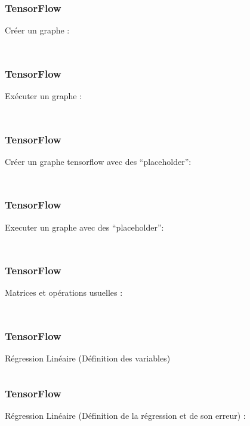 
\begin{frame}
  \frametitle{TensorFlow}
  Créer un graphe :
  \inputminted[linenos,fontsize=\small,bgcolor=pythonbg]{python}{code-illustration/tf-create_graph.py}
  \inputminted[linenos,fontsize=\small,bgcolor=returnbg]{text}{code-illustration/tf-create_graph.txt}
\end{frame}

\begin{frame}
  \frametitle{TensorFlow}
  Exécuter un graphe :
  \inputminted[linenos,fontsize=\small,bgcolor=pythonbg]{python}{code-illustration/tf-run_graph.py}
  \inputminted[linenos,fontsize=\small,bgcolor=returnbg]{text}{code-illustration/tf-run_graph.txt}
\end{frame}

\begin{frame}
  \frametitle{TensorFlow}
  Créer un graphe tensorflow avec des ``placeholder'':
  \inputminted[linenos,fontsize=\small,bgcolor=pythonbg]{python}{code-illustration/tf-create_graph_placeholder.py}
  \inputminted[linenos,fontsize=\small,bgcolor=returnbg]{text}{code-illustration/tf-create_graph_placeholder.txt}
\end{frame}

\begin{frame}
  \frametitle{TensorFlow}
  Executer un graphe avec des ``placeholder'':
  \inputminted[linenos,fontsize=\small,bgcolor=pythonbg]{python}{code-illustration/tf-run_graph_placeholder.py}
  \inputminted[linenos,fontsize=\small,bgcolor=returnbg]{text}{code-illustration/tf-run_graph_placeholder.txt}
\end{frame}

\begin{frame}
  \frametitle{TensorFlow}
  Matrices et opérations usuelles :
  \inputminted[linenos,fontsize=\small,bgcolor=pythonbg]{python}{code-illustration/tf-matrices.py}
  \inputminted[linenos,fontsize=\small,bgcolor=returnbg]{text}{code-illustration/tf-matrices.txt}
\end{frame}

\begin{frame}
  \frametitle{TensorFlow}
  Régression Linéaire (Définition des variables)
  \inputminted[linenos,fontsize=\small,bgcolor=pythonbg]{python}{code-illustration/tf-regression_lineaire-0.py}
\end{frame}

\begin{frame}
  \frametitle{TensorFlow}
  Régression Linéaire (Définition de la régression et de son erreur) :
  \inputminted[linenos,fontsize=\small,bgcolor=pythonbg]{python}{code-illustration/tf-regression_lineaire-1.py}
\end{frame}

